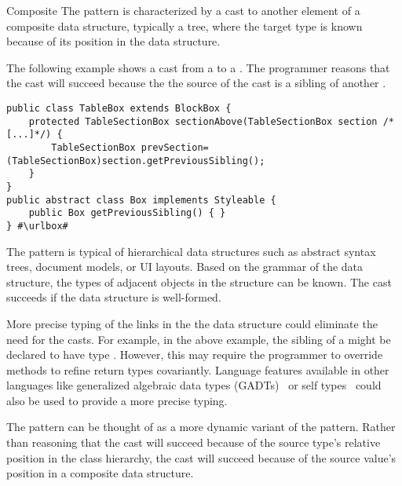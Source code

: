 \begin{pattern}{Composite}
The \thisp{} pattern is characterized by a cast to another element of a
composite data structure, typically a tree, where the target type is known because of its
position in the data structure.

\instances{}
The following example shows a cast from a  to a .
The programmer reasons that the cast will succeed because the 
the source of the cast is a sibling of another .

\def\urlvar{http://bit.ly/flyingsaucerproject_flyingsaucer_2N2nYbY}
\begin{verbatim}
public class TableBox extends BlockBox {
    protected TableSectionBox sectionAbove(TableSectionBox section /*[...]*/) {
        TableSectionBox prevSection=(TableSectionBox)section.getPreviousSibling();
    }
}
public abstract class Box implements Styleable {
    public Box getPreviousSibling() { }
} #\urlbox#
\end{verbatim}

\issues{}
The pattern is typical of hierarchical data structures such as abstract syntax
trees, document models, or UI layouts. Based on the grammar of 
the data structure, the types of adjacent objects in the structure can be known.
The cast succeeds if the data structure is well-formed.

More precise typing of the links in the the data structure could 
eliminate the need for the casts. For example, in the above example,
the sibling of a  might be declared to have type
. However, this may require the programmer to override
methods to refine return types covariantly.
Language features available in other languages like generalized algebraic data types (GADTs)~\citep{gadts} or self types~\citep{bruceChallengingTypingIssues2003,scalaIndependentlyExtensible} could also be used to provide a more precise typing.

The pattern can be thought of as a more dynamic variant of the
 pattern. Rather than
reasoning that the cast will succeed because of the source type's relative position in the 
class hierarchy, the cast will succeed because of the source value's position
in a composite data structure.

\end{pattern}
